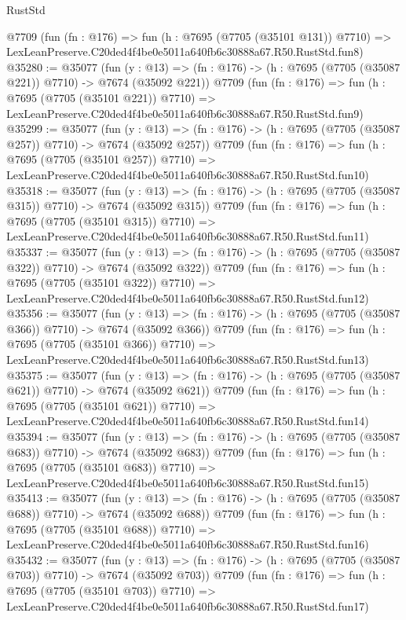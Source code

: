 \begin{lexlean}{RustStd}
\begin{coremodule}
    @7709
    (fun (fn : @176) =>
    fun (h : @7695 (@7705 (@35101 @131)) @7710) =>
    LexLeanPreserve.C20ded4f4be0e5011a640fb6c30888a67.R50.RustStd.fun8)
@35280 := @35077
    (fun (y : @13) => (fn : @176) -> (h : @7695 (@7705 (@35087 @221)) @7710) -> @7674 (@35092 @221))
    @7709
    (fun (fn : @176) =>
    fun (h : @7695 (@7705 (@35101 @221)) @7710) =>
    LexLeanPreserve.C20ded4f4be0e5011a640fb6c30888a67.R50.RustStd.fun9)
@35299 := @35077
    (fun (y : @13) => (fn : @176) -> (h : @7695 (@7705 (@35087 @257)) @7710) -> @7674 (@35092 @257))
    @7709
    (fun (fn : @176) =>
    fun (h : @7695 (@7705 (@35101 @257)) @7710) =>
    LexLeanPreserve.C20ded4f4be0e5011a640fb6c30888a67.R50.RustStd.fun10)
@35318 := @35077
    (fun (y : @13) => (fn : @176) -> (h : @7695 (@7705 (@35087 @315)) @7710) -> @7674 (@35092 @315))
    @7709
    (fun (fn : @176) =>
    fun (h : @7695 (@7705 (@35101 @315)) @7710) =>
    LexLeanPreserve.C20ded4f4be0e5011a640fb6c30888a67.R50.RustStd.fun11)
@35337 := @35077
    (fun (y : @13) => (fn : @176) -> (h : @7695 (@7705 (@35087 @322)) @7710) -> @7674 (@35092 @322))
    @7709
    (fun (fn : @176) =>
    fun (h : @7695 (@7705 (@35101 @322)) @7710) =>
    LexLeanPreserve.C20ded4f4be0e5011a640fb6c30888a67.R50.RustStd.fun12)
@35356 := @35077
    (fun (y : @13) => (fn : @176) -> (h : @7695 (@7705 (@35087 @366)) @7710) -> @7674 (@35092 @366))
    @7709
    (fun (fn : @176) =>
    fun (h : @7695 (@7705 (@35101 @366)) @7710) =>
    LexLeanPreserve.C20ded4f4be0e5011a640fb6c30888a67.R50.RustStd.fun13)
@35375 := @35077
    (fun (y : @13) => (fn : @176) -> (h : @7695 (@7705 (@35087 @621)) @7710) -> @7674 (@35092 @621))
    @7709
    (fun (fn : @176) =>
    fun (h : @7695 (@7705 (@35101 @621)) @7710) =>
    LexLeanPreserve.C20ded4f4be0e5011a640fb6c30888a67.R50.RustStd.fun14)
@35394 := @35077
    (fun (y : @13) => (fn : @176) -> (h : @7695 (@7705 (@35087 @683)) @7710) -> @7674 (@35092 @683))
    @7709
    (fun (fn : @176) =>
    fun (h : @7695 (@7705 (@35101 @683)) @7710) =>
    LexLeanPreserve.C20ded4f4be0e5011a640fb6c30888a67.R50.RustStd.fun15)
@35413 := @35077
    (fun (y : @13) => (fn : @176) -> (h : @7695 (@7705 (@35087 @688)) @7710) -> @7674 (@35092 @688))
    @7709
    (fun (fn : @176) =>
    fun (h : @7695 (@7705 (@35101 @688)) @7710) =>
    LexLeanPreserve.C20ded4f4be0e5011a640fb6c30888a67.R50.RustStd.fun16)
@35432 := @35077
    (fun (y : @13) => (fn : @176) -> (h : @7695 (@7705 (@35087 @703)) @7710) -> @7674 (@35092 @703))
    @7709
    (fun (fn : @176) =>
    fun (h : @7695 (@7705 (@35101 @703)) @7710) =>
    LexLeanPreserve.C20ded4f4be0e5011a640fb6c30888a67.R50.RustStd.fun17)

\end{coremodule}
\end{lexlean}
